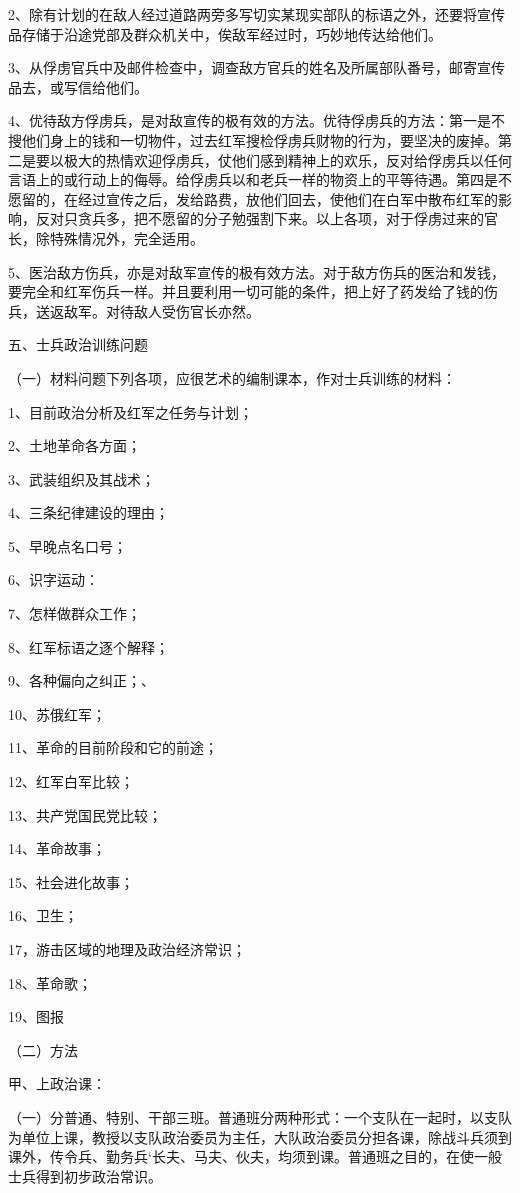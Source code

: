 2、除有计划的在敌人经过道路两旁多写切实某现实部队的标语之外，还要将宣传品存储于沿途党部及群众机关中，俟敌军经过时，巧妙地传达给他们。

3、从俘虏官兵中及邮件检查中，调查敌方官兵的姓名及所属部队番号，邮寄宣传品去，或写信给他们。

4、优待敌方俘虏兵，是对敌宣传的极有效的方法。优待俘虏兵的方法：第一是不搜他们身上的钱和一切物件，过去红军搜检俘虏兵财物的行为，要坚决的废掉。第二是要以极大的热情欢迎俘虏兵，仗他们感到精神上的欢乐，反对给俘虏兵以任何言语上的或行动上的侮辱。给俘虏兵以和老兵一样的物资上的平等待遇。第四是不愿留的，在经过宣传之后，发给路费，放他们回去，使他们在白军中散布红军的影响，反对只贪兵多，把不愿留的分子勉强割下来。以上各项，对于俘虏过来的官长，除特殊情况外，完全适用。

5、医治敌方伤兵，亦是对敌军宣传的极有效方法。对于敌方伤兵的医治和发钱，要完全和红军伤兵一样。并且要利用一切可能的条件，把上好了药发给了钱的伤兵，送返敌军。对待敌人受伤官长亦然。

五、士兵政治训练问题

（一）材料问题下列各项，应很艺术的编制课本，作对士兵训练的材料：

1、目前政治分析及红军之任务与计划；

2、土地革命各方面；

3、武装组织及其战术；

4、三条纪律建设的理由；

5、早晚点名口号；

6、识字运动：

7、怎样做群众工作；

8、红军标语之逐个解释；

9、各种偏向之纠正；、

10、苏俄红军；

11、革命的目前阶段和它的前途；

12、红军白军比较；

13、共产党国民党比较；

14、革命故事；

15、社会进化故事；

16、卫生；

17，游击区域的地理及政治经济常识；

18、革命歌；

19、图报

（二）方法

甲、上政治课：

（一）分普通、特别、干部三班。普通班分两种形式：一个支队在一起时，以支队为单位上课，教授以支队政治委员为主任，大队政治委员分担各课，除战斗兵须到课外，传令兵、勤务兵`长夫、马夫、伙夫，均须到课。普通班之目的，在使一般士兵得到初步政治常识。

